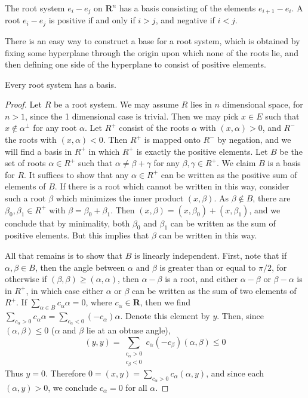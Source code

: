 \begin{example}
    The root system $e_i - e_j$ on $\mathbf{R}^n$ has a basis consisting of the elements $e_{i+1} - e_i$. A root $e_i - e_j$ is positive if and only if $i > j$, and negative if $i < j$.
\end{example}

There is an easy way to construct a base for a root system, which is obtained by fixing some hyperplane through the origin upon which none of the roots lie, and then defining one side of the hyperplane to consist of positive elements.

\begin{theorem}
    Every root system has a basis.
\end{theorem}
\begin{proof}
    Let $R$ be a root system. We may assume $R$ lies in $n$ dimensional space, for $n > 1$, since the 1 dimensional case is trivial. Then we may pick $x \in E$ such that $x \not \in \alpha^\perp$ for any root $\alpha$. Let $R^+$ consist of the roots $\alpha$ with $(x, \alpha) > 0$, and $R^-$ the roots with $(x, \alpha) < 0$. Then $R^+$ is mapped onto $R^-$ by negation, and we will find a basis in $R^+$ in which $R^+$ is exactly the positive elements. Let $B$ be the set of roots $\alpha \in R^+$ such that $\alpha \neq \beta + \gamma$ for any $\beta, \gamma \in R^+$. We claim $B$ is a basis for $R$. It suffices to show that any $\alpha \in R^+$ can be written as the positive sum of elements of $B$. If there is a root which cannot be written in this way, consider such a root $\beta$ which minimizes the inner product $(x, \beta)$. As $\beta \not \in B$, there are $\beta_0, \beta_1 \in R^+$ with $\beta = \beta_0 + \beta_1$. Then $(x,\beta) = (x, \beta_0) + (x,\beta_1)$, and we conclude that by minimality, both $\beta_0$ and $\beta_1$ can be written as the sum of positive elements. But this implies that $\beta$ can be written in this way.

    All that remains is to show that $B$ is linearly independent. First, note that if $\alpha, \beta \in B$, then the angle between $\alpha$ and $\beta$ is greater than or equal to $\pi/2$, for otherwise if $(\beta, \beta) \geq (\alpha, \alpha)$, then $\alpha - \beta$ is a root, and either $\alpha - \beta$ or $\beta - \alpha$ is in $R^+$, in which case either $\alpha$ or $\beta$ can be written as the sum of two elements of $R^+$. If $\sum_{\alpha \in B} c_\alpha \alpha = 0$, where $c_\alpha \in \mathbf{R}$, then we find $\sum_{c_\alpha > 0} c_\alpha \alpha = \sum_{c_\alpha < 0} (-c_\alpha) \alpha$. Denote this element by $y$. Then, since $(\alpha, \beta) \leq 0$ ($\alpha$ and $\beta$ lie at an obtuse angle),
    \[ (y,y) = \sum_{\substack{c_\alpha > 0\\c_\beta < 0}} c_\alpha (-c_\beta) (\alpha, \beta) \leq 0 \]
    Thus $y = 0$. Therefore $0 = (x,y) = \sum_{c_\alpha > 0} c_\alpha (\alpha, y)$, and since each $(\alpha, y) > 0$, we conclude $c_\alpha = 0$ for all $\alpha$.
\end{proof}

